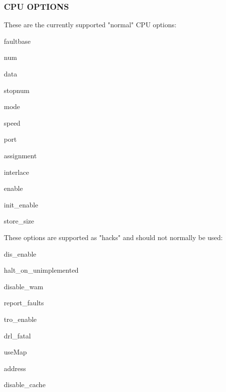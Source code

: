 
\subsubsection[CPU Options]{CPU OPTIONS}

These are the currently supported "normal" CPU options:

faultbase

num

data

stopnum

mode

speed

port

assignment

interlace

enable

init\_enable

store\_size

These options are supported as "hacks" and should not normally be used:

dis\_enable

halt\_on\_unimplemented

disable\_wam

report\_faults

tro\_enable

drl\_fatal

useMap

address

disable\_cache
